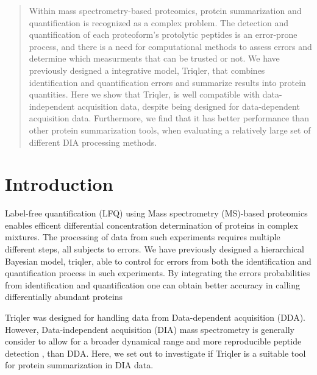 \documentclass[10pt,letterpaper]{article}
\begin{document}
\maketitle

\begin{abstract}

Within mass spectrometry-based proteomics, protein summarization and quantification is recognized as a complex problem. The detection and quantification of each proteoform's protolytic peptides is an error-prone process, and there is a need for computational methods to assess errors and determine which measurments that can be trusted or not.  We have previously designed a integrative model, Triqler, that combines identification and quantification errors and summarize results into protein quantities. 
Here we show that Triqler, is well compatible with data-independent acquisition data, despite being designed for data-dependent acquisition data. Furthermore, we find that it has better performance than other protein summarization tools, when evaluating a relatively large set of different DIA processing methods. 

\end{abstract}
  

\section*{Introduction}
Label-free quantification (LFQ) using Mass spectrometry (MS)-based proteomics enables efficent differential concentration determination of proteins in complex mixtures. The processing of data from such experiments requires multiple different steps, all subjects to errors. We have previously designed a hierarchical Bayesian model, triqler, able to control for errors from both the identification and quantification process in such experiments\cite{The2018Integrated}. By integrating the errors probabilities from identification and quantification one can obtain better accuracy in calling differentially abundant proteins   

Triqler was designed for handling data from Data-dependent acquisition (DDA). However, Data-independent acquisition (DIA) mass spectrometry \cite{venable2004data} is generally consider to allow for a broader dynamical range and more reproducible peptide detection \cite{zhang2020DIA, Lu2021DIAmeter}, than DDA. Here, we set out to investigate if Triqler is a suitable tool for protein summarization in DIA data.
\end{document}

